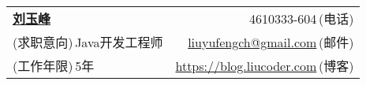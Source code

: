 \newcommand{\myheader}{
\begin{tabular*}{\textwidth}{l@{\extracolsep{\fill}}r}
  \textbf{\href{https://blog.liucoder.com}{\LARGE 刘玉峰}} & 4610333-604$\,${\color{labelgrey}(电话)} \\
  {\color{labelgrey}(求职意向)}$\,$Java开发工程师 & \href{mailto:liuyufengch@gmail.com}{liuyufengch@gmail.com}$\,${\color{labelgrey}(邮件)} \\
  {\color{labelgrey}(工作年限)}$\,$5年 & \href{https://blog.liucoder.com}{https://blog.liucoder.com}$\,${\color{labelgrey}(博客)} \\
\end{tabular*}\\\vspace{0.1in}}

\myheader